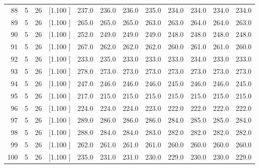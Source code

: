 \documentclass[12pt,a4paper]{article}
\begin{document}
\begin{center}
{\begin{tabular}{r r r r r r r r r r r r}
  88&  5& 26&[1.100     ]&   237.0&   236.0&   236.0&   235.0&   234.0&   234.0&   234.0&   234.0\\[-0.02in]
  89&  5& 26&[1.100     ]&   265.0&   265.0&   265.0&   263.0&   263.0&   264.0&   264.0&   263.0\\[-0.02in]
  90&  5& 26&[1.100     ]&   252.0&   249.0&   249.0&   249.0&   248.0&   248.0&   248.0&   248.0\\[-0.02in]
  91&  5& 26&[1.100     ]&   267.0&   262.0&   262.0&   262.0&   260.0&   261.0&   261.0&   260.0\\[-0.02in]
  92&  5& 26&[1.100     ]&   233.0&   235.0&   233.0&   233.0&   233.0&   234.0&   233.0&   233.0\\[-0.02in]
  93&  5& 26&[1.100     ]&   278.0&   273.0&   273.0&   273.0&   273.0&   273.0&   273.0&   273.0\\[-0.02in]
  94&  5& 26&[1.100     ]&   247.0&   246.0&   246.0&   246.0&   245.0&   246.0&   246.0&   245.0\\[-0.02in]
  95&  5& 26&[1.100     ]&   217.0&   215.0&   215.0&   215.0&   215.0&   215.0&   215.0&   215.0\\[-0.02in]
  96&  5& 26&[1.100     ]&   224.0&   224.0&   224.0&   223.0&   222.0&   222.0&   222.0&   222.0\\[-0.02in]
  97&  5& 26&[1.100     ]&   289.0&   286.0&   286.0&   286.0&   284.0&   285.0&   285.0&   284.0\\[-0.02in]
  98&  5& 26&[1.100     ]&   288.0&   284.0&   284.0&   283.0&   282.0&   282.0&   282.0&   282.0\\[-0.02in]
  99&  5& 26&[1.100     ]&   262.0&   261.0&   261.0&   261.0&   260.0&   260.0&   260.0&   260.0\\[-0.02in]
 100&  5& 26&[1.100     ]&   235.0&   231.0&   231.0&   230.0&   229.0&   230.0&   230.0&   229.0\\[-0.02in]

\hline
\end{tabular}}
\end{center}
\end{document}

